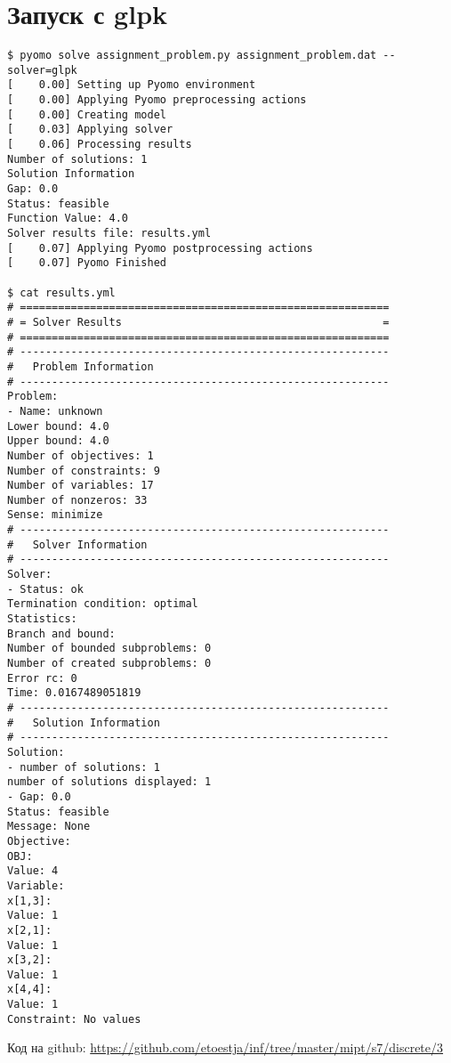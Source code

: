\documentclass[a4paper]{article}
\begin{document}
\section*{Запуск с glpk}
\begin{verbatim}
$ pyomo solve assignment_problem.py assignment_problem.dat --solver=glpk
[    0.00] Setting up Pyomo environment
[    0.00] Applying Pyomo preprocessing actions
[    0.00] Creating model
[    0.03] Applying solver
[    0.06] Processing results
Number of solutions: 1
Solution Information
Gap: 0.0
Status: feasible
Function Value: 4.0
Solver results file: results.yml
[    0.07] Applying Pyomo postprocessing actions
[    0.07] Pyomo Finished

$ cat results.yml
# ==========================================================
# = Solver Results                                         =
# ==========================================================
# ----------------------------------------------------------
#   Problem Information
# ----------------------------------------------------------
Problem: 
- Name: unknown
Lower bound: 4.0
Upper bound: 4.0
Number of objectives: 1
Number of constraints: 9
Number of variables: 17
Number of nonzeros: 33
Sense: minimize
# ----------------------------------------------------------
#   Solver Information
# ----------------------------------------------------------
Solver: 
- Status: ok
Termination condition: optimal
Statistics: 
Branch and bound: 
Number of bounded subproblems: 0
Number of created subproblems: 0
Error rc: 0
Time: 0.0167489051819
# ----------------------------------------------------------
#   Solution Information
# ----------------------------------------------------------
Solution: 
- number of solutions: 1
number of solutions displayed: 1
- Gap: 0.0
Status: feasible
Message: None
Objective:
OBJ:
Value: 4
Variable:
x[1,3]:
Value: 1
x[2,1]:
Value: 1
x[3,2]:
Value: 1
x[4,4]:
Value: 1
Constraint: No values
\end{verbatim}

Код на github: \url{https://github.com/etoestja/inf/tree/master/mipt/s7/discrete/3}
\end{document}

